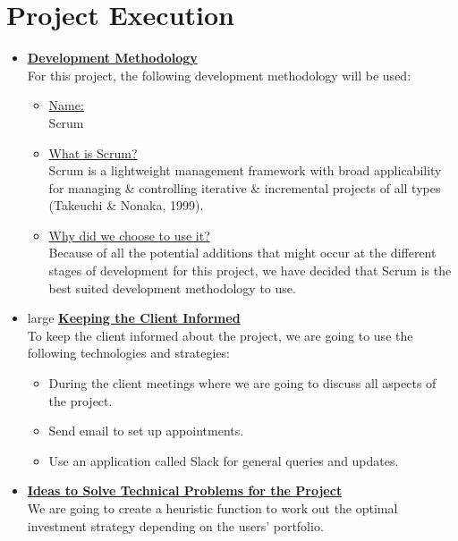 \documentclass[a4paper,12pt]{article}
\begin{document}
\newpage

\section{Project Execution}

\begin{itemize}
\item {\large \underline{\textbf{Development Methodology}}}\\[0.2cm]
For this project, the following development methodology will be used:

	\begin{itemize}
 		\item \underline{Name:}
		\\[0.1cm]
		 Scrum
		\item  \underline{What is Scrum?}
		\\[0.1cm]
		Scrum is a lightweight management framework with broad applicability for managing \& controlling iterative \& 				incremental projects of all types (Takeuchi \& Nonaka, 1999).
		\item \underline{Why did we choose to use it?}
		\\[0.1cm]
		Because of all the potential additions that might occur at the different stages of development for this project, we 			have decided that Scrum is the best suited development methodology to use.
	\end{itemize}
\bigskip

\item {large \underline{\textbf{Keeping the Client Informed}}}\\[0.2cm]
To keep the client informed about the project, we are going to use the following technologies and strategies:

	\begin{itemize}
	\item During the client meetings where we are going to discuss all aspects of the project.
	\item Send email to set up appointments.
	\item Use an application called Slack for general queries and updates.
	\end{itemize} 

\bigskip
\item {\large \underline{\textbf{Ideas to Solve Technical Problems for the Project}}}\\[0.2cm]
We are going to create a heuristic function to work out the optimal investment strategy depending on the users’ portfolio. 
	\begin{itemize}


\end{itemize}
\end{itemize}
\end{document}
